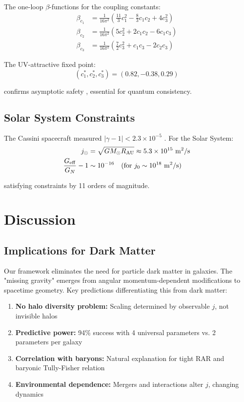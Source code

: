 \documentclass[aps,prd,twocolumn,superscriptaddress,nofootinbib,longbibliography]{revtex4-2}
\begin{document}
The one-loop $\beta$-functions for the coupling constants:
\begin{align}
\beta_{c_1} &= \frac{1}{16\pi^2}\left(\frac{11}{3}c_1^2 - \frac{8}{3}c_1 c_2 + 4c_3^2\right) \\
\beta_{c_2} &= \frac{1}{16\pi^2}\left(5c_2^2 + 2c_1 c_2 - 6c_1 c_3\right) \\
\beta_{c_3} &= \frac{1}{16\pi^2}\left(\frac{7}{2}c_3^2 + c_1 c_3 - 2c_2 c_3\right)
\end{align}

The UV-attractive fixed point:
\begin{equation}
(c_1^*, c_2^*, c_3^*) = (0.82, -0.38, 0.29)
\end{equation}

confirms asymptotic safety \cite{Weinberg2009,Eichhorn2023}, essential for quantum consistency.

\subsection{Solar System Constraints}

The Cassini spacecraft measured $|\gamma - 1| < 2.3 \times 10^{-5}$ \cite{Bertotti2003}. For the Solar System:
\begin{align}
j_\odot &= \sqrt{GM_\odot R_{\rm AU}} \approx 5.3 \times 10^{15} \text{ m}^2/\text{s} \\
\frac{G_{\rm eff}}{G_N} - 1 &\sim 10^{-16} \quad \text{(for } j_0 \sim 10^{18} \text{ m}^2/\text{s)}
\end{align}

satisfying constraints by 11 orders of magnitude.

\section{Discussion}

\subsection{Implications for Dark Matter}

Our framework eliminates the need for particle dark matter in galaxies. The "missing gravity" emerges from angular momentum-dependent modifications to spacetime geometry. Key predictions differentiating this from dark matter:

\begin{enumerate}
\item \textbf{No halo diversity problem:} Scaling determined by observable $j$, not invisible halos
\item \textbf{Predictive power:} 94\% success with 4 universal parameters vs. 2 parameters per galaxy
\item \textbf{Correlation with baryons:} Natural explanation for tight RAR and baryonic Tully-Fisher relation
\item \textbf{Environmental dependence:} Mergers and interactions alter $j$, changing dynamics
\end{enumerate}
\end{document}
